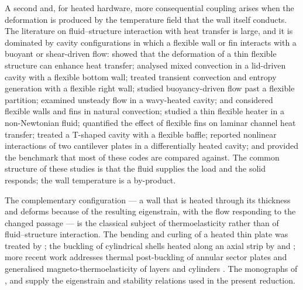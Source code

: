 \documentclass[11pt,a4paper]{article}
\begin{document}
A second and, for heated hardware, more consequential coupling arises when
the deformation is produced by the temperature field that the wall itself
conducts. The literature on fluid--structure interaction with heat transfer is
large, and it is dominated by cavity configurations in which a flexible wall
or fin interacts with a buoyant or shear-driven flow:
\citet{soti2015flow} showed that the deformation of a thin flexible
structure can enhance heat transfer; \citet{alamiri2011fluid} analysed mixed
convection in a lid-driven cavity with a flexible bottom wall;
\citet{alsabery2019transient,alsabery2019entropy} treated transient
convection and entropy generation with a flexible right wall;
\citet{zargartalebi2018fluid} studied buoyancy-driven flow past a flexible
partition; \citet{saleh2025impact} examined unsteady flow in a wavy-heated
cavity; \citet{gong2025effects} and \citet{ahmed2024enhancing} considered
flexible walls and fins in natural convection; \citet{chowdhury2025fluid}
studied a thin flexible heater in a non-Newtonian fluid;
\citet{derakhshandeh2026fluid} quantified the effect of flexible fins on
laminar channel heat transfer; \citet{benhamida2022fluid} treated a T-shaped
cavity with a flexible baffle; \citet{kumar2026nonlinear} reported nonlinear
interactions of two cantilever plates in a differentially heated cavity; and
\citet{turek2006proposal} provided the benchmark that most of these codes are
compared against. The common structure of these studies is that the fluid
supplies the load and the solid responds; the wall temperature is a
by-product.

The complementary configuration --- a wall that is heated through its
thickness and deforms because of the resulting eigenstrain, with the flow
responding to the changed passage --- is the classical subject of
thermoelasticity rather than of fluid--structure interaction. The bending and
curling of a heated thin plate was treated by \citet{mansfield1962bending};
the buckling of cylindrical shells heated along an axial strip by
\citet{hoff1964buckling} and \citet{ross1965buckling}; more recent work
addresses thermal post-buckling of annular sector plates
\citep{mehrabi2025axisymmetric} and generalised magneto-thermoelasticity of
layers and cylinders \citep{sadeghi2022generalized,karimipour2023lord,
gupta2024photo}. The monographs of \citet{boley1960theory},
\citet{timoshenko1970elasticity} and \citet{timoshenko1961stability} supply
the eigenstrain and stability relations used in the present reduction.
\end{document}
